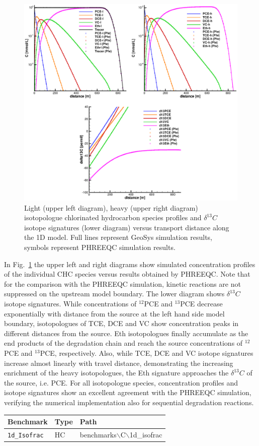 \begin{figure}[htbp]
\centering
\includegraphics[width=1\textwidth]{C/figures/Fig_isofrac_prof.eps}
\caption{Light (upper left diagram), heavy (upper right diagram) isotopologue chlorinated hydrocarbon species profiles and $\delta^{13}C$ isotope signatures (lower diagram) versus transport distance along the 1D model. Full lines represent GeoSys simulation results, symbols represent PHREEQC simulation results.}
\label{profiles_isofrac_C}
\end{figure}

In Fig.~\ref{profiles_isofrac_C} the upper left and right diagrams show simulated concentration profiles of the individual CHC species versus results obtained by PHREEQC. Note that for the comparison with the PHREEQC simulation, kinetic reactions are not suppressed on the upstream model boundary. The lower diagram shows $\delta^{13}C$ isotope signatures. While concentrations of $^{12}$PCE and $^{13}$PCE decrease exponentially with distance from the source at the left hand side model boundary, isotopologues of TCE, DCE and VC show concentration peaks in different distances from the source. Eth isotopologues finally accumulate as the end products of the degradation chain and reach the source concentrations of $^{12}$PCE and $^{13}$PCE, respectively. Also, while TCE, DCE and VC isotope signatures increase almost linearly with travel distance, demonstrating the increasing enrichment of the heavy isotopologues, the Eth signature approaches the $\delta^{13}C$ of the source, i.e. PCE. For all isotopologue species, concentration profiles and isotope signatures show an excellent agreement with the PHREEQC simulation, verifying the numerical implementation also for sequential degradation reactions.

\begin{table}[htbp]
\centering
\begin{tabular}{|l|l|l|}
\hline
Benchmark & Type & Path \\
\hline
\texttt{1d\_Isofrac}& HC &  benchmarks$\backslash$C$\backslash$1d\_isofrac  \\			
\hline
\end{tabular}
\end{table}
